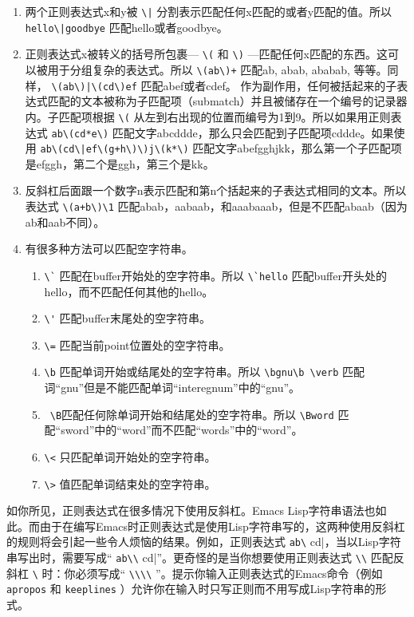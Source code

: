 \begin{enumerate}
  \item 两个正则表达式x和y被 \verb+\|+ 分割表示匹配任何x匹配的或者y匹配的值。所以 \verb+hello\|goodbye+ 匹配hello或者goodbye。
  \item 正则表达式x被转义的括号所包裹--- \verb|\(| 和 \verb|\)| ---匹配任何x匹配的东西。这可以被用于分组复杂的表达式。所以 \verb|\(ab\)+| 匹配ab, abab, ababab, 等等。同样， \verb+\(ab\)|\(cd\)ef+ 匹配abef或者cdef。
作为副作用，任何被括起来的子表达式匹配的文本被称为子匹配项（submatch）并且被储存在一个编号的记录器内。子匹配项根据 \verb|\(| 从左到右出现的位置而编号为1到9。所以如果用正则表达式 \verb|ab\(cd*e\)| 匹配文字abcddde，那么只会匹配到子匹配项cddde。如果使用 \verb=ab\(cd\|ef\(g+h\)\)j\(k*\)= 匹配文字abefgghjkk，那么第一个子匹配项是efggh，第二个是ggh，第三个是kk。
  \item 反斜杠后面跟一个数字n表示匹配和第n个括起来的子表达式相同的文本。所以表达式 \verb|\(a+b\)\1| 匹配abab，aabaab，和aaabaaab，但是不匹配abaab（因为ab和aab不同）。
  \item 有很多种方法可以匹配空字符串。
  \begin{enumerate}
    \item \verb|\`| 匹配在buffer开始处的空字符串。所以 \verb|\`hello| 匹配buffer开头处的hello，而不匹配任何其他的hello。
    \item \verb|\'| 匹配buffer末尾处的空字符串。
    \item \verb|\=| 匹配当前point位置处的空字符串。
    \item \verb|\b| 匹配单词开始或结尾处的空字符串。所以 \verb|\bgnu\b \verb| 匹配词“gnu”但是不能匹配单词“interegnum”中的“gnu”。
    \item \verb| \B|匹配任何除单词开始和结尾处的空字符串。所以 \verb|\Bword| 匹配“sword”中的“word”而不匹配“words”中的“word”。
    \item \verb|\<| 只匹配单词开始处的空字符串。
    \item \verb|\>| 值匹配单词结束处的空字符串。
  \end{enumerate}
\end{enumerate}

如你所见，正则表达式在很多情况下使用反斜杠。Emacs Lisp字符串语法也如此。而由于在编写Emacs时正则表达式是使用Lisp字符串写的，这两种使用反斜杠的规则将会引起一些令人烦恼的结果。例如，正则表达式 \verb|ab\| cd|，当以Lisp字符串写出时，需要写成“ \verb|ab\\| cd|”。更奇怪的是当你想要使用正则表达式 \verb|\\| 匹配反斜杠 \verb|\| 时：你必须写成“ \verb|\\\\| ”。提示你输入正则表达式的Emacs命令（例如 \texttt{apropos} 和 \texttt{keeplines} ）允许你在输入时只写正则而不用写成Lisp字符串的形式。

